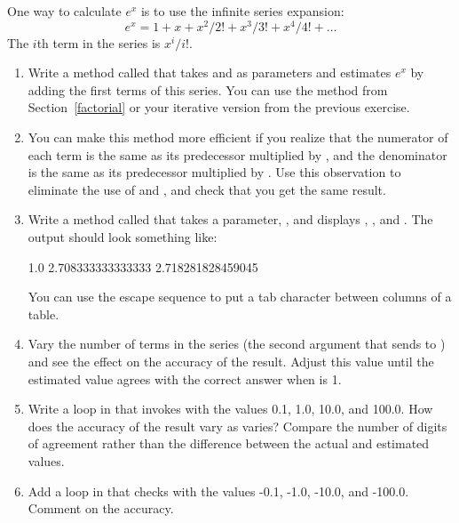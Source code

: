 \begin{exercise}  %

One way to calculate $e^x$ is to use the infinite series expansion:
%
\[ e^x = 1 + x + x^2 / 2! + x^3 / 3! + x^4 / 4! + \ldots \]
%
The $i$th term in the series is $x^i / i!$.

\begin{enumerate}

\item Write a method called  that takes  and  as parameters and estimates $e^x$ by adding the first  terms of this series.
You can use the  method from Section~\ref{factorial} or your iterative version from the previous exercise.


\item You can make this method more efficient if you realize that the numerator of each term is the same as its predecessor multiplied by , and the denominator is the same as its predecessor multiplied by .
Use this observation to eliminate the use of  and , and check that you get the same result.

\item Write a method called  that takes a parameter, , and displays , , and .
The output should look something like:

\begin{stdout}
1.0     2.708333333333333     2.718281828459045
\end{stdout}

You can use the escape sequence  to put a tab character between columns of a table.

\item Vary the number of terms in the series (the second argument that  sends to ) and see the effect on the accuracy of the result.
Adjust this value until the estimated value agrees with the correct answer when  is 1.

\item Write a loop in  that invokes  with the values 0.1, 1.0, 10.0, and 100.0.
How does the accuracy of the result vary as  varies?
Compare the number of digits of agreement rather than the difference between the actual and estimated values.

\item Add a loop in  that checks  with the values -0.1, -1.0, -10.0, and -100.0.
Comment on the accuracy.

\end{enumerate}

\end{exercise}


